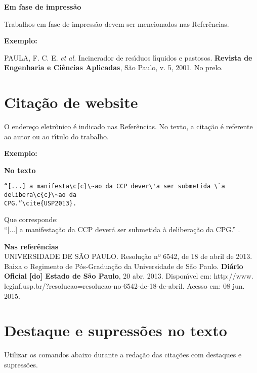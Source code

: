 \textbf{Em fase de impress\~ao}

Trabalhos em fase de impress\~ao devem ser mencionados nas Refer\^encias.

\textbf{Exemplo:}

\begin{alineas}
	\item
PAULA, F. C. E. \textit{et al.} Incinerador de res\'{\i}duos l\'{\i}quidos e pastosos. \textbf{Revista de
Engenharia e Ci\^encias Aplicadas}, S\~ao Paulo, v. 5, 2001. No prelo.
\end{alineas}


\section{Cita\c{c}\~ao de website}

O endere\c{c}o eletr\^onico \'e indicado nas Refer\^encias. No texto, a cita\c{c}\~ao \'e referente ao autor ou ao t\'{\i}tulo do trabalho. 

\textbf{Exemplo:}

\begin{alineas}
\item
\textbf{No texto}
\begin{verbatim}
“[...] a manifesta\c{c}\~ao da CCP dever\'a ser submetida \`a delibera\c{c}\~ao da
CPG.”\cite{USP2013}.
\end{verbatim}
Que corresponde:\\
“[...] a manifesta\c{c}\~ao da CCP dever\'a ser submetida \`a delibera\c{c}\~ao da
CPG.” \cite{USP2013}. \\

\item 
\textbf{Nas refer\^encias}\\

UNIVERSIDADE DE S\~AO PAULO. Resolu\c{c}\~ao nº 6542, de 18 de abril de 2013.
Baixa o Regimento de P\'os-Gradua\c{c}\~ao da Universidade de S\~ao Paulo. \textbf{Di\'ario
Oficial [do] Estado de S\~ao Paulo}, 20 abr. 2013. Dispon\'{\i}vel em: http://www.
leginf.usp.br/?resolucao=resolucao-no-6542-de-18-de-abril. Acesso em: 08 jun.
2015.
\end{alineas}

\section{Destaque e supress\~oes no texto}

Utilizar os comandos abaixo durante a reda\c{c}\~ao das cita\c{c}\~oes com destaques e supress\~oes.

